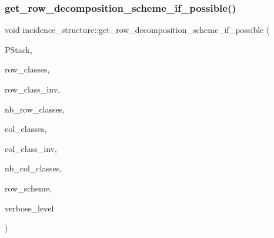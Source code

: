 \subsubsection{\texorpdfstring{get\+\_\+row\+\_\+decomposition\+\_\+scheme\+\_\+if\+\_\+possible()}{get\_row\_decomposition\_scheme\_if\_possible()}}
{\footnotesize\ttfamily void incidence\+\_\+structure\+::get\+\_\+row\+\_\+decomposition\+\_\+scheme\+\_\+if\+\_\+possible (\begin{DoxyParamCaption}\item[{\mbox{\hyperlink{classpartitionstack}{partitionstack}} \&}]{P\+Stack,  }\item[{\mbox{\hyperlink{galois_8h_a09fddde158a3a20bd2dcadb609de11dc}{I\+NT}} $\ast$}]{row\+\_\+classes,  }\item[{\mbox{\hyperlink{galois_8h_a09fddde158a3a20bd2dcadb609de11dc}{I\+NT}} $\ast$}]{row\+\_\+class\+\_\+inv,  }\item[{\mbox{\hyperlink{galois_8h_a09fddde158a3a20bd2dcadb609de11dc}{I\+NT}}}]{nb\+\_\+row\+\_\+classes,  }\item[{\mbox{\hyperlink{galois_8h_a09fddde158a3a20bd2dcadb609de11dc}{I\+NT}} $\ast$}]{col\+\_\+classes,  }\item[{\mbox{\hyperlink{galois_8h_a09fddde158a3a20bd2dcadb609de11dc}{I\+NT}} $\ast$}]{col\+\_\+class\+\_\+inv,  }\item[{\mbox{\hyperlink{galois_8h_a09fddde158a3a20bd2dcadb609de11dc}{I\+NT}}}]{nb\+\_\+col\+\_\+classes,  }\item[{\mbox{\hyperlink{galois_8h_a09fddde158a3a20bd2dcadb609de11dc}{I\+NT}} $\ast$}]{row\+\_\+scheme,  }\item[{\mbox{\hyperlink{galois_8h_a09fddde158a3a20bd2dcadb609de11dc}{I\+NT}}}]{verbose\+\_\+level }\end{DoxyParamCaption})}

\mbox{\label{classincidence__structure_a13191a7c41cd54c5a453e82395893ad9}} 
